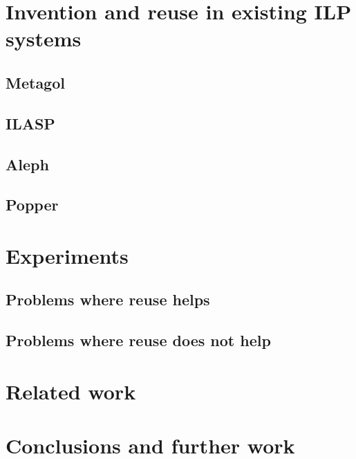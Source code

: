\documentclass{article}
\begin{document}
\section{Invention and reuse in existing ILP systems}
\subsection{Metagol}
\subsection{ILASP}
\subsection{Aleph}
\subsection{Popper}

\section{Experiments}
\subsection{Problems where reuse helps}
\subsection{Problems where reuse does not help}

\section{Related work}

\section{Conclusions and further work}








\end{document}
